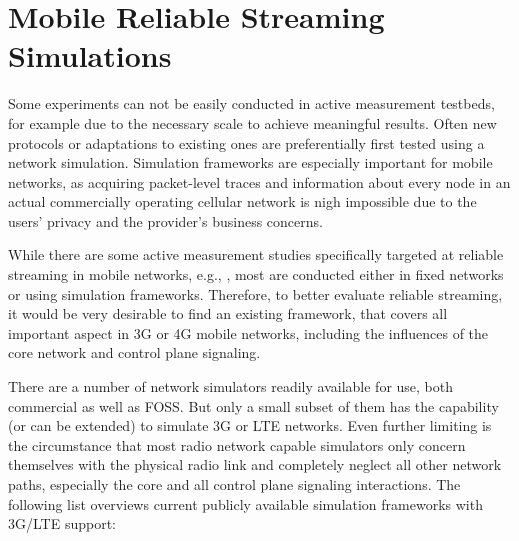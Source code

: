 \section{Mobile Reliable Streaming Simulations}
\label{c6:sec:mobilestreamingtestbed}

Some experiments can not be easily conducted in active measurement testbeds, for example due to the necessary scale to achieve meaningful results. Often new protocols or adaptations to existing ones are preferentially first tested using a network simulation. Simulation frameworks are especially important for mobile networks, as acquiring packet-level traces and information about every node in an actual commercially operating cellular network is nigh impossible due to the users' privacy and the provider's business concerns.

While there are some active measurement studies specifically targeted at reliable streaming in mobile networks, e.g., \cite{Muller:2012:EDA:2151677.2151686}, most are conducted either in fixed networks or using simulation frameworks. Therefore, to better evaluate reliable streaming, it would be very desirable to find an existing framework, that covers all important aspect in \gls{3G} or 4G mobile networks, including the influences of the core network and control plane signaling.

There are a number of network simulators readily available for use, both commercial as well as \gls{FOSS}. But only a small subset of them has the capability (or can be extended) to simulate \gls{3G} or \gls{LTE} networks. Even further limiting is the circumstance that most radio network capable simulators only concern themselves with the physical radio link and completely neglect all other network paths, especially the core and all control plane signaling interactions. The following list overviews current publicly available simulation frameworks with \gls{3G}/\gls{LTE} support:

